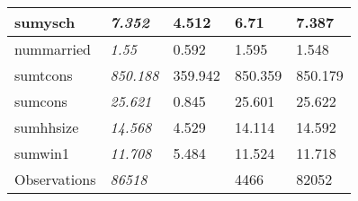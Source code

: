 \documentclass[]{tufte-handout}
\begin{document}
\begin{table}[H]
\begin{tabular}{>{}l||>{\em}l|l|l|l}
\hline
sumysch & 7.352 & 4.512 & 6.71 & 7.387\\
\hline
nummarried & 1.55 & 0.592 & 1.595 & 1.548\\
\hline
sumtcons & 850.188 & 359.942 & 850.359 & 850.179\\
\hline
sumcons & 25.621 & 0.845 & 25.601 & 25.622\\
\hline
sumhhsize & 14.568 & 4.529 & 14.114 & 14.592\\
\hline
sumwin1 & 11.708 & 5.484 & 11.524 & 11.718\\
\hline
Observations & 86518 &  & 4466 & 82052\\
\hline
\end{tabular}
\endgroup{}
\end{table}
\end{document}
